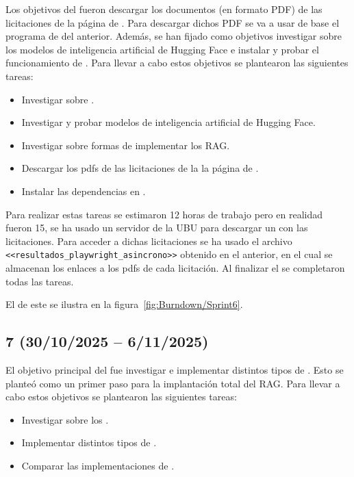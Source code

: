 Los objetivos del  fueron descargar los documentos (en formato PDF) de las licitaciones de la página de \contsec{}. Para descargar dichos PDF se va a usar de base el programa de  del  anterior. Además, se han fijado como objetivos investigar sobre los modelos de inteligencia artificial de Hugging Face e instalar y probar el funcionamiento de .
Para llevar a cabo estos objetivos se plantearon las siguientes tareas:
\begin{itemize}
\tightlist
	\item Investigar sobre .
	\item Investigar y probar modelos de inteligencia artificial de Hugging Face.
	\item Investigar sobre formas de implementar los RAG.
	\item Descargar los pdfs de las licitaciones de la la página de \contsec{}.
	\item Instalar las dependencias en .
\end{itemize}

Para realizar estas tareas se estimaron 12 horas de trabajo pero en realidad fueron 15, se ha usado un servidor de la UBU para descargar un  con las licitaciones. Para acceder a dichas licitaciones se ha usado el archivo \texttt{<<resultados\_playwright\_asincrono>>} obtenido en el  anterior, en el cual se almacenan los enlaces a los pdfs de cada licitación. Al finalizar el  se completaron todas las tareas.

El  de este  se ilustra en la figura~\ref{fig:Burndown/Sprint6}.

\subsection{ 7 (30/10/2025 -- 6/11/2025)}

El objetivo principal del  fue investigar e implementar distintos tipos de . Esto se planteó como un primer paso para la implantación total del RAG.
Para llevar a cabo estos objetivos se plantearon las siguientes tareas:
\begin{itemize}
\tightlist
	\item Investigar sobre los .
	\item Implementar distintos tipos de .
	\item Comparar las implementaciones de .
\end{itemize}

